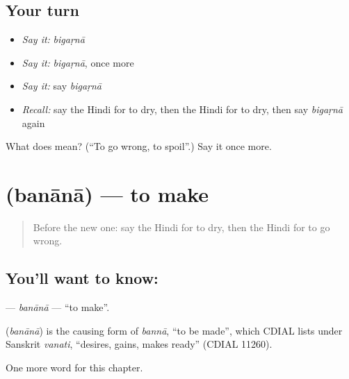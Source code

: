 \subsection*{Your turn}
\begin{itemize}
\raggedright
  \item \emph{Say it:} \emph{bigaṛnā}
  \item \emph{Say it:} \emph{bigaṛnā}, once more
  \item \emph{Say it:} say \emph{bigaṛnā}
  \item \emph{Recall:} say the Hindi for to dry, then the Hindi for to dry, then say \emph{bigaṛnā} again
\end{itemize}

\begin{tcolorbox}[breakable,colback=teal!4,colframe=teal!35!black,title={Before you move on}]
What does  mean? (\textquotedblleft{}To go wrong, to spoil\textquotedblright{}.) Say it once more.
\end{tcolorbox}
\section[\texorpdfstring{\hi{बनाना} (banānā)}{बनाना (banānā)}]{ (banānā) — to make}

\label{lesson:HI-C226-banana}



\begin{quote}
Before the new one: say the Hindi for to dry, then the Hindi for to go wrong.
\end{quote}

\subsection*{You'll want to know: }
\textbf{} — \emph{banānā} — \textquotedblleft{}to make\textquotedblright{}.

\begin{cousinweb}
\textbf{} (\emph{banānā}) is the causing form of \emph{bannā}, \textquotedblleft{}to be made\textquotedblright{}, which CDIAL lists under Sanskrit \emph{vanati}, \textquotedblleft{}desires, gains, makes ready\textquotedblright{} (CDIAL 11260).
\end{cousinweb}

\begin{grammarlens}[title={What you've built}]
One more word for this chapter.
\end{grammarlens}


